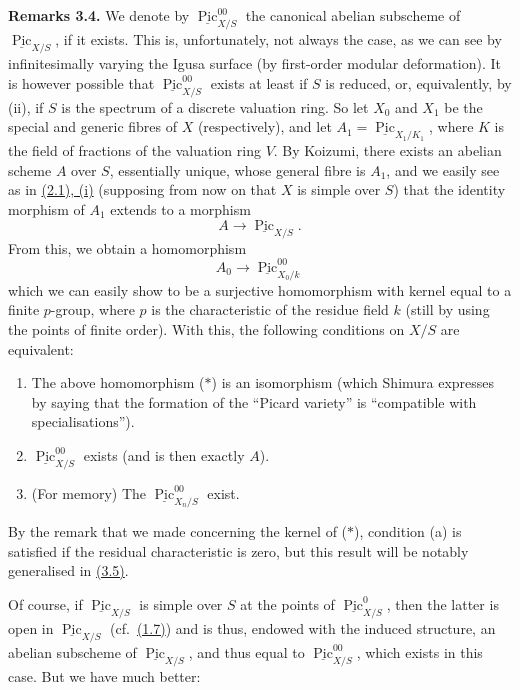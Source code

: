 \documentclass{article}
\providecommand{\tightlist}{%
  \setlength{\itemsep}{0pt}\setlength{\parskip}{0pt}}
\newenvironment{rmenv}[1]
  {\phantomsection\par\smallskip\noindent\textbf{#1.}\rmfamily}
  {\par\smallskip}
\newcommand{\oldpage}[1]{\marginpar{\footnotesize$\Big\vert$ \textit{p.~#1}}}
\theoremstyle{definition}
\theoremstyle{definition}
\theoremstyle{definition}
\theoremstyle{definition}
\theoremstyle{remark}
\begin{document}
\leavevmode{}%
\begin{rmenv}{Remarks 3.4}
We denote by \(\underline{\operatorname{Pic}}_{X/S}^{00}\) the canonical abelian subscheme of \(\underline{\operatorname{Pic}}_{X/S}\), if it exists.
This is, unfortunately, not always the case, as we can see by infinitesimally varying the Igusa surface (by first-order modular deformation).
It is however possible that \(\underline{\operatorname{Pic}}_{X/S}^{00}\) exists at least if \(S\) is reduced, or, equivalently, by (ii), if \(S\) is the spectrum of a discrete valuation ring.
So let \(X_0\) and \(X_1\) be the special and generic fibres of \(X\) (respectively), and let \(A_1=\underline{\operatorname{Pic}}_{X_1/K_1}\), where \(K\) is the field of fractions of the valuation ring \(V\).
By Koizumi, there exists an abelian scheme \(A\) over \(S\), essentially unique, whose general fibre is \(A_1\), and we easily see as in \protect\hyperlink{fga-3-vi-theorem-2.1}{(2.1), (i)} (supposing from now on that \(X\) is simple over \(S\)) that the identity morphism of \(A_1\) extends to a morphism
\[
  A \to \underline{\operatorname{Pic}}_{X/S}.
\]
From this, we obtain a homomorphism
\[
  A_0 \to \underline{\operatorname{Pic}}_{X_0/k}^{00}
\tag{$\ast$}
\]
which we can easily show to be a surjective homomorphism with kernel equal to a finite \(p\)-group, where \(p\) is the characteristic of the residue field \(k\) (still by using the points of finite order).
\oldpage{236-19}With this, the following conditions on \(X/S\) are equivalent:

\begin{enumerate}
\def\labelenumi{\alph{enumi}.}
\tightlist
\item
  The above homomorphism (\(\ast\)) is an isomorphism (which Shimura expresses by saying that the formation of the ``Picard variety'' is ``compatible with specialisations'').
\item
  \(\underline{\operatorname{Pic}}_{X/S}^{00}\) exists (and is then exactly \(A\)).
\item
  (For memory) The \(\underline{\operatorname{Pic}}_{X_n/S}^{00}\) exist.
\end{enumerate}

By the remark that we made concerning the kernel of (\(\ast\)), condition (a) is satisfied if the residual characteristic is zero, but this result will be notably generalised in \protect\hyperlink{fga-3-vi-theorem-3.5}{(3.5)}.

Of course, if \(\underline{\operatorname{Pic}}_{X/S}\) is simple over \(S\) at the points of \(\underline{\operatorname{Pic}}_{X/S}^0\), then the latter is open in \(\underline{\operatorname{Pic}}_{X/S}\) (cf.~\protect\hyperlink{fga-3-vi-corollary-1.7}{(1.7)}) and is thus, endowed with the induced structure, an abelian subscheme of \(\underline{\operatorname{Pic}}_{X/S}\), and thus equal to \(\underline{\operatorname{Pic}}_{X/S}^{00}\), which exists in this case.
But we have much better:

\end{rmenv}
\end{document}
